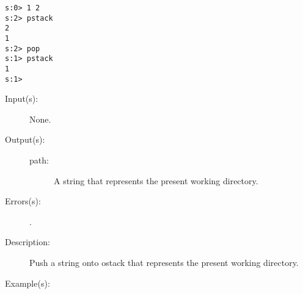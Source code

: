 \begin{description}
\begin{description}
\begin{verbatim}
s:0> 1 2
s:2> pstack
2
1
s:2> pop
s:1> pstack
1
s:1>
		\end{verbatim}
	\end{description}
\label{systemdict:pwd}
\item[{\stilop{--}{pwd}{path}}: ]
	\begin{description}\item[]
	\item[Input(s): ] None.
	\item[Output(s): ]
		\begin{description}\item[]
		\item[path: ]
			A string that represents the present working directory.
		\end{description}
	\item[Errors(s): ]
		\begin{description}\item[]
		\item[.]
		\end{description}
	\item[Description: ]
		Push a string onto ostack that represents the present working
		directory.
	\item[Example(s): ]\begin{verbatim}


\end{verbatim}
\end{description}
\end{description}

